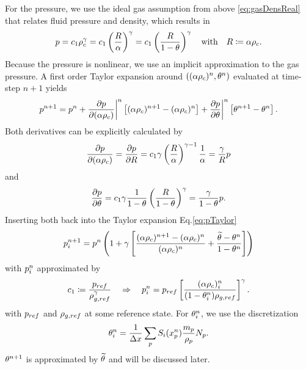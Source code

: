 For the pressure, we use the ideal gas assumption from above \eqref{eq:gasDensReal} that relates fluid pressure and density, which results in
\begin{equation}
    p = c_1 \rho_c^\gamma = c_1 \left( \dfrac{R}{\alpha}\right)^\gamma = c_1 \left( \dfrac{R}{1 - \theta}\right)^\gamma \quad \text{with} \quad R \coloneq \alpha \rho_c.
\end{equation}
Because the pressure is nonlinear, we use an implicit approximation to the gas pressure. 
A first order Taylor expansion around $((\alpha \rho_c)^{n},\theta^n)$  evaluated at time-step $n+1$ yields
\begin{equation}
\label{eq:pTaylor}
    p^{n+1} = p^n + \dfrac{\partial p}{\partial (\alpha \rho_c)}\bigg|^n \left[ (\alpha \rho_c )^{n+1} - (\alpha \rho_c)^n \right] +\dfrac{\partial p}{\partial \theta}\bigg|^n \left[ \theta  ^{n+1} - \theta^n \right].
\end{equation}
Both derivatives can be explicitly calculated by
\begin{equation}
    \dfrac{\partial p}{\partial (\alpha \rho_c)} = \dfrac{\partial p}{\partial R} = c_1 \gamma \left( \dfrac{R}{\alpha}\right)^{\gamma -1} \dfrac{1}{\alpha}= \dfrac{\gamma}{R} p
\end{equation}
and
\begin{equation}
    \dfrac{\partial p}{\partial \theta} = c_1 \gamma \dfrac{1}{1- \theta} \left( \dfrac{R}{1 - \theta}\right)^\gamma = \dfrac{\gamma}{1-\theta} p.
\end{equation}
Inserting both back into the Taylor expansion Eq.\eqref{eq:pTaylor}
\begin{equation}
    p_i^{n+1} = p^n \left( 1 + \gamma \left[\dfrac{(\alpha \rho_c)^{n+1} - (\alpha \rho_c)^{n}}{(\alpha \rho_c)^n} + \dfrac{\widetilde{\theta} - \theta^n}{1 - \theta^n} \right] \right)
\end{equation}
with $p_i^{n}$ approximated by
\begin{equation}
    c_1 \coloneq \dfrac{p_{ref}}{\rho_{g,ref}^\gamma} \quad  \Rightarrow \quad p_i^n = p_{ref} \left[ \dfrac{(\alpha \rho_c )_i^n}{(1- \theta_i^n)\rho_{g,ref}} \right]^\gamma.
\end{equation}
with $p_{ref}$ and $\rho_{g,ref}$ at some reference state. For $\theta_i^n$, we use the discretization
\begin{equation}
    \theta_i^n = \dfrac{1}{\Delta x} \sum_p S_i(x_p^n) \dfrac{m_p}{\rho_p} N_p.
\end{equation}
$\theta^{n+1}$ is approximated by $\widetilde{\theta}$ and will be discussed later. 

